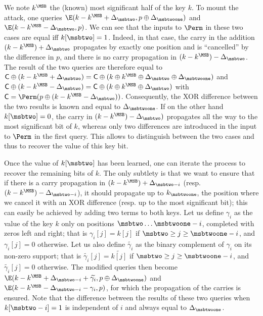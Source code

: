 We note $k^\MSB$ the (known) most significant half of the key $k$.
To mount the attack, one queries $\E(k - k^\MSB + \Delta_\msbtwo, p \oplus \Delta_{\msbtwoone})$ and
$\E(k - k^\MSB - \Delta_\msbtwo, p)$. We can see that the inputs to $\Perm$ in these two cases are equal
iff $k[\msbtwo] = 1$. Indeed, in that case,
the carry in the addition $(k - k^\MSB) + \Delta_\msbtwo$ propagates by exactly one position and is ``cancelled'' by
the difference in $p$, and there is no carry propagation in $(k - k^\MSB) - \Delta_\msbtwo$.
The result of the two queries are therefore equal to
$\mathsf{C} \oplus (k - k^\MSB + \Delta_\msbtwo) = \mathsf{C} \oplus (k \oplus k^\MSB \oplus \Delta_\msbtwo \oplus \Delta_\msbtwoone)$ and
$\mathsf{C} \oplus (k - k^\MSB - \Delta_\msbtwo) = \mathsf{C} \oplus (k \oplus k^\MSB \oplus \Delta_\msbtwo)$
with $\mathsf{C} = \Perm(p \oplus (k - k^\MSB - \Delta_\msbtwo))$.
Consequently, the XOR difference between the two results is known and equal to $\Delta_\msbtwoone$.
If on the other hand
$k[\msbtwo] = 0$, the carry in $(k - k^\MSB) - \Delta_\msbtwo)$ propagates all the way to the most significant bit of $k$, whereas only
two differences are introduced in the input to $\Perm$ in the first query. This allows to distinguish between the two cases and thus to recover the value of this key bit.

Once the value of $k[\msbtwo]$ has been learned, one can iterate the process to recover the remaining bits of $k$.
The only subtlety is that we want to ensure that if there is a carry propagation in
$(k - k^\MSB) + \Delta_{\msbtwo - i}$ (resp. $(k - k^\MSB) - \Delta_{\msbtwo - i}$),
it should propagate up to $k_{\msbtwoone}$, the position where we cancel it with an XOR difference
(resp. up to the most significant bit); this can easily be achieved by adding two terms to both keys.
Let us define $\gamma_i$ as the value of the key $k$ only on positions $\msbtwo\ldots\msbtwoone - i$, completed with zeros left and right;
that is $\gamma_i[j] = k[j]$ if $\msbtwo \geq j \geq \msbtwoone - i$, and $\gamma_i[j] = 0$ otherwise.
Let us also define $\widetilde{\gamma_i}$ as the binary complement of $\gamma_i$ on its non-zero support;
that is $\widetilde{\gamma_i}[j] = \widetilde{k[j]}$ if $\msbtwo \geq j \geq \msbtwoone - i$, and $\widetilde{\gamma_i}[j] = 0$ otherwise.
The modified queries then become $\E(k - k^\MSB + \Delta_{\msbtwo - i} + \widetilde{\gamma_i}, p \oplus \Delta_{\msbtwoone})$ and
$\E(k - k^\MSB - \Delta_{\msbtwo - i} - \gamma_i, p)$, for which the propagation of the carries is ensured. Note that
the difference between the results of these two queries when $k[\msbtwo - i] = 1$ is independent of $i$ and always equal
to $\Delta_\msbtwoone$. 



